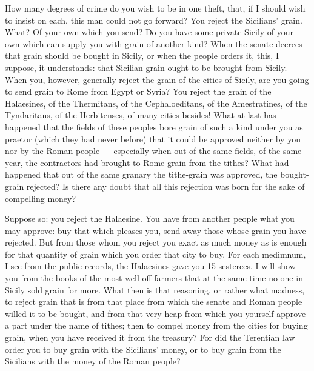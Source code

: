  How many degrees of crime do you wish to be in one theft, that, if I should wish to insist on each, this man could not go forward? You reject the Sicilians' grain. What? Of your own which you send? Do you have some private Sicily of your own which can supply you with grain of another kind? When the senate decrees that grain should be bought in Sicily, or when the people orders it, this, I suppose, it understands: that Sicilian grain ought to be brought from Sicily. When you, however, generally reject the grain of the cities of Sicily, are you going to send grain to Rome from Egypt or Syria? You reject the grain of the Halaesines, of the Thermitans, of the Cephaloeditans, of the Amestratines, of the Tyndaritans, of the Herbitenses, of many cities besides! What at last has happened that the fields of these peoples bore grain of such a kind under you as praetor (which they had never before) that it could be approved neither by you nor by the Roman people --- especially when out of the same fields, of the same year, the contractors had brought to Rome grain from the tithes? What had happened that out of the same granary the tithe-grain was approved, the bought-grain rejected? Is there any doubt that all this rejection was born for the sake of compelling money?

 Suppose so: you reject the Halaesine. You have from another people what you may approve: buy that which pleases you, send away those whose grain you have rejected. But from those whom you reject you exact as much money as is enough for that quantity of grain which you order that city to buy. For each medimnum, I see from the public records, the Halaesines gave you 15 sesterces. I will show you from the books of the most well-off farmers that at the same time no one in Sicily sold grain for more. What then is that reasoning, or rather what madness, to reject grain that is from that place from which the senate and Roman people willed it to be bought, and from that very heap from which you yourself approve a part under the name of tithes; then to compel money from the cities for buying grain, when you have received it from the treasury? For did the Terentian law order you to buy grain with the Sicilians' money, or to buy grain from the Sicilians with the money of the Roman people?

